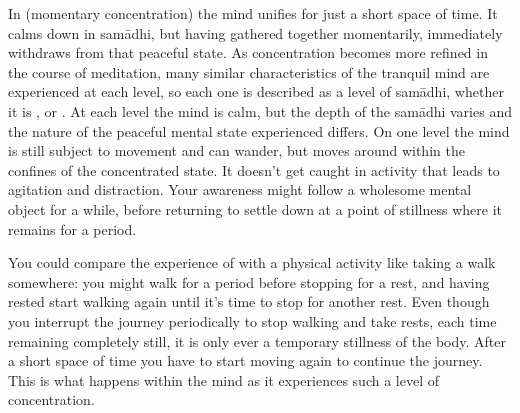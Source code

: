 In  (momentary concentration) the mind unifies for just a short space of time. It calms down in sam\=adhi, but having gathered together momentarily, immediately withdraws from that peaceful state. As concentration becomes more refined in the course of meditation, many similar characteristics of the tranquil mind are experienced at each level, so each one is described as a level of sam\=adhi, whether it is ,  or . At each level the mind is calm, but the depth of the sam\=adhi varies and the nature of the peaceful mental state experienced differs. On one level the mind is still subject to movement and can wander, but moves around within the confines of the concentrated state. It doesn't get caught in activity that leads to agitation and distraction. Your awareness might follow a wholesome mental object for a while, before returning to settle down at a point of stillness where it remains for a period. 

You could compare the experience of  with a physical activity like taking a walk somewhere: you might walk for a period before stopping for a rest, and having rested start walking again until it's time to stop for another rest. Even though you interrupt the journey periodically to stop walking and take rests, each time remaining completely still, it is only ever a temporary stillness of the body. After a short space of time you have to start moving again to continue the journey. This is what happens within the mind as it experiences such a level of concentration. 


